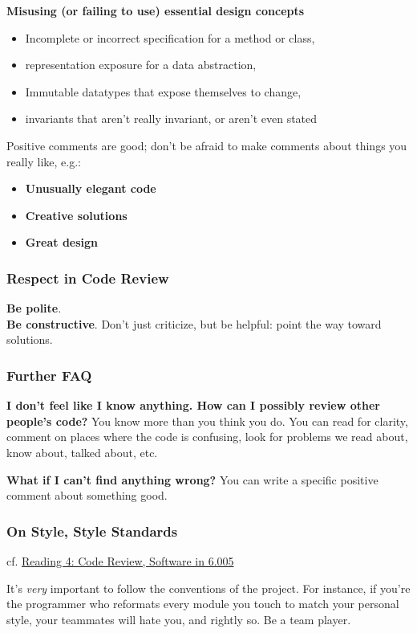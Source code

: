 \documentclass[10pt]{amsart}
\begin{document}
\textbf{Misusing (or failing to use) essential design concepts}
\begin{itemize}
	\item Incomplete or incorrect specification for a method or class,
	\item representation exposure for a data abstraction,
	\item Immutable datatypes that expose themselves to change,
	\item invariants that aren't really invariant, or aren't even stated
\end{itemize}

Positive comments are good; don't be afraid to make comments about things you really like, e.g.:
\begin{itemize}
	\item \textbf{Unusually elegant code}
	\item \textbf{Creative solutions}
	\item \textbf{Great design}
\end{itemize}

\subsubsection{Respect in Code Review}
\textbf{Be polite}. \\
\textbf{Be constructive}. Don't just criticize, but be helpful: point the way toward solutions.

\subsubsection{Further FAQ}

\textbf{I don't feel like I know anything. How can I possibly review other people's code?} You know more than you think you do. You can read for clarity, comment on places where the code is confusing, look for problems we read about, know about, talked about, etc.

\textbf{What if I can't find anything wrong?} You can write a specific positive comment about something good.


\subsubsection{On Style, Style Standards}

cf. \href{https://ocw.mit.edu/ans7870/6/6.005/s16/classes/04-code-review/index.html}{Reading 4: Code Review, Software in 6.005}

It's \emph{very} important to follow the conventions of the project. For instance, if you're the programmer who reformats every module you touch to match your personal style, your teammates will hate you, and rightly so. Be a team player.
\end{document}
